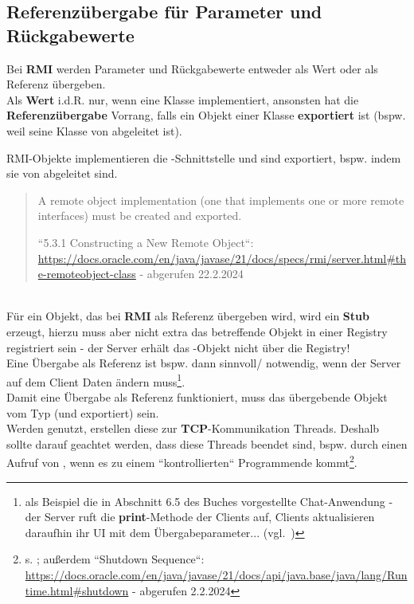 \subsection{Referenzübergabe für Parameter und Rückgabewerte}\label{sec:refrmi}

Bei \textbf{RMI} werden Parameter und Rückgabewerte entweder als Wert oder als Referenz übergeben.\\

\noindent
Als \textbf{Wert} i.d.R. nur, wenn eine Klasse  implementiert, ansonsten hat die \textbf{Referenzübergabe} Vorrang, falls ein Objekt einer Klasse \textbf{exportiert} ist (bspw. weil seine Klasse von  abgeleitet ist).

\begin{tcolorbox}[enlarge top by=0.5cm,enlarge bottom by=0.5cm]
    RMI-Objekte implementieren die -Schnittstelle und sind exportiert, bspw. indem sie von  abgeleitet sind.\\

    \blockquote[{``5.3.1 Constructing a New Remote Object``: \url{https://docs.oracle.com/en/java/javase/21/docs/specs/rmi/server.html#the-remoteobject-class} - abgerufen 22.2.2024}]{
        A remote object implementation (one that implements one or more remote interfaces) must be created and exported.
    }
\end{tcolorbox}\\

\noindent
Für ein Objekt, das bei \textbf{RMI} als Referenz übergeben wird, wird ein \textbf{Stub} erzeugt, hierzu muss aber nicht extra das betreffende Objekt in einer Registry registriert sein - der Server erhält das -Objekt nicht über die Registry!\\

\noindent
Eine Übergabe als Referenz ist bspw. dann sinnvoll/ notwendig, wenn der Server auf dem Client Daten ändern muss\footnote{als Beispiel die in Abschnitt 6.5 des Buches vorgestellte Chat-Anwendung - der Server ruft die \textbf{print}-Methode der Clients auf, Clients aktualisieren daraufhin ihr UI mit dem Übergabeparameter... (vgl.~\cite[Listing 6.22, Listing 6.24]{Oec22})}.\\

\noindent
Damit eine Übergabe als Referenz funktioniert, muss das übergebende Objekt vom Typ  (und exportiert) sein.\\

\noindent
Werden  genutzt, erstellen diese zur \textbf{TCP}-Kommunikation Threads.
Deshalb sollte darauf geachtet werden, dass diese Threads beendet sind, bspw. durch einen Aufruf von , wenn es zu einem ``kontrollierten`` Programmende kommt\footnote{s. \cite[352]{Oec22}; außerdem ``Shutdown Sequence``: \url{https://docs.oracle.com/en/java/javase/21/docs/api/java.base/java/lang/Runtime.html#shutdown} - abgerufen 2.2.2024
}.

